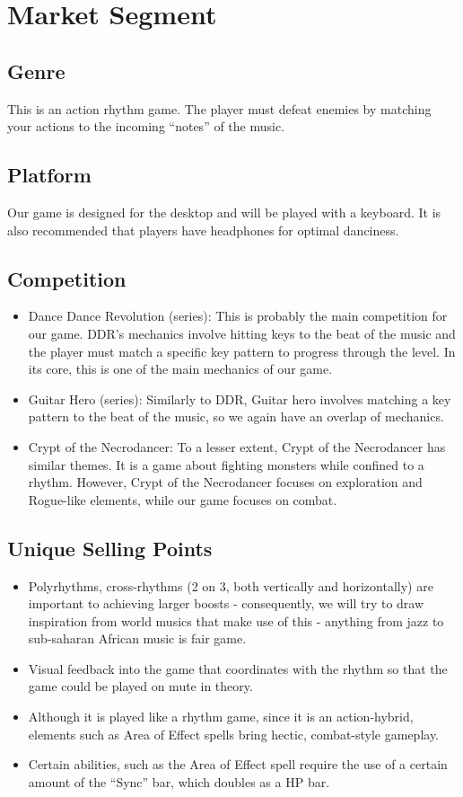 \documentclass[]{article}
\begin{document}
\pagebreak
\section*{Market Segment}
\subsection*{Genre}
This is an action rhythm game. The player must defeat enemies by matching your 
actions to the incoming “notes” of the music.

\subsection*{Platform}
Our game is designed for the desktop and will be played with a keyboard. 
It is also recommended that players have headphones for optimal danciness. 

\subsection*{Competition}
\begin{itemize}
\item Dance Dance Revolution (series): This is probably the main
  competition for our game. DDR’s mechanics involve hitting keys to the
  beat of the music and the player must match a specific key pattern to
  progress through the level. In its core, this is one of the main
  mechanics of our game.
\item Guitar Hero (series): Similarly to DDR, Guitar hero involves
  matching a key pattern to the beat of the music, so we again have an
  overlap of mechanics.
\item Crypt of the Necrodancer: To a lesser extent, Crypt of the
  Necrodancer has similar themes. It is a game about fighting monsters
  while confined to a rhythm. However, Crypt of the Necrodancer focuses
  on exploration and Rogue-like elements, while our game focuses on
  combat.
\end{itemize}
\subsection*{Unique Selling Points}
\begin{itemize}
\item Polyrhythms, cross-rhythms (2 on 3, both vertically and
  horizontally) are important to achieving larger boosts - consequently,
  we will try to draw inspiration from world musics that make use of
  this - anything from jazz to sub-saharan African music is fair game.
\item Visual feedback into the game that coordinates with the rhythm
  so that the game could be played on mute in theory.
\item Although it is played like a rhythm game, since it is an
  action-hybrid, elements such as Area of Effect spells bring hectic,
  combat-style gameplay.
\item Certain abilities, such as the Area of Effect spell require the
  use of a certain amount of the “Sync” bar, which doubles as a HP bar.
\end{itemize}
\end{document}

